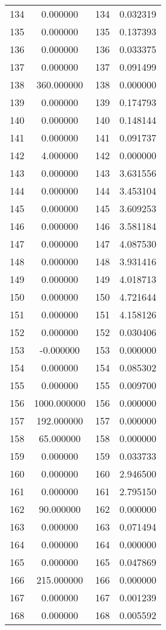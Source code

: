 \documentclass[12pt]{article}
\begin{document}
\begin{longtable}{@{}cccc@{}}
134 & 0.000000 & 134 & 0.032319 \\
135 & 0.000000 & 135 & 0.137393 \\
136 & 0.000000 & 136 & 0.033375 \\
137 & 0.000000 & 137 & 0.091499 \\
138 & 360.000000 & 138 & 0.000000 \\
139 & 0.000000 & 139 & 0.174793 \\
140 & 0.000000 & 140 & 0.148144 \\
141 & 0.000000 & 141 & 0.091737 \\
142 & 4.000000 & 142 & 0.000000 \\
143 & 0.000000 & 143 & 3.631556 \\
144 & 0.000000 & 144 & 3.453104 \\
145 & 0.000000 & 145 & 3.609253 \\
146 & 0.000000 & 146 & 3.581184 \\
147 & 0.000000 & 147 & 4.087530 \\
148 & 0.000000 & 148 & 3.931416 \\
149 & 0.000000 & 149 & 4.018713 \\
150 & 0.000000 & 150 & 4.721644 \\
151 & 0.000000 & 151 & 4.158126 \\
152 & 0.000000 & 152 & 0.030406 \\
153 & -0.000000 & 153 & 0.000000 \\
154 & 0.000000 & 154 & 0.085302 \\
155 & 0.000000 & 155 & 0.009700 \\
156 & 1000.000000 & 156 & 0.000000 \\
157 & 192.000000 & 157 & 0.000000 \\
158 & 65.000000 & 158 & 0.000000 \\
159 & 0.000000 & 159 & 0.033733 \\
160 & 0.000000 & 160 & 2.946500 \\
161 & 0.000000 & 161 & 2.795150 \\
162 & 90.000000 & 162 & 0.000000 \\
163 & 0.000000 & 163 & 0.071494 \\
164 & 0.000000 & 164 & 0.000000 \\
165 & 0.000000 & 165 & 0.047869 \\
166 & 215.000000 & 166 & 0.000000 \\
167 & 0.000000 & 167 & 0.001239 \\
168 & 0.000000 & 168 & 0.005592 \\

\end{longtable}
\end{document}
